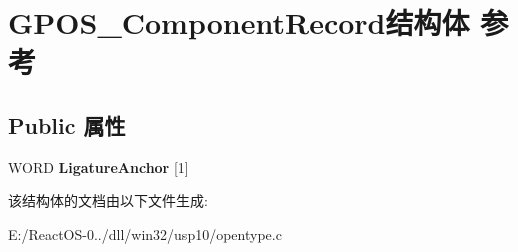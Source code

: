 \hypertarget{struct_g_p_o_s___component_record}{}\section{G\+P\+O\+S\+\_\+\+Component\+Record结构体 参考}
\label{struct_g_p_o_s___component_record}
\subsection*{Public 属性}
\begin{DoxyCompactItemize}
\item 
\mbox{\label{struct_g_p_o_s___component_record_a3eae8ac3147989d9aaab14582c871979}} 
W\+O\+RD {\bfseries Ligature\+Anchor} \mbox{[}1\mbox{]}
\end{DoxyCompactItemize}


该结构体的文档由以下文件生成\+:\begin{DoxyCompactItemize}
\item 
E\+:/\+React\+O\+S-\/0../dll/win32/usp10/opentype.\+c\end{DoxyCompactItemize}
